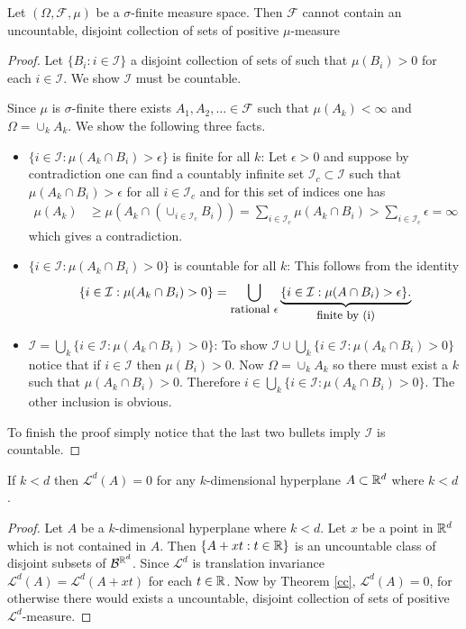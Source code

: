 \begin{theorem}
\label{cc}
Let $(\Omega, \mathcal F,\mu)$ be a $\sigma$-finite measure space. Then $\mathcal F$ cannot contain an uncountable, disjoint collection of sets of positive $\mu$-measure
\end{theorem}
\begin{proof}
Let $\{B_i: i\in \mathcal I\}$ a disjoint collection of sets of such that $\mu(B_i)>0$ for each $i\in\mathcal I$.
We show $\mathcal I$ must be countable.


Since $\mu$ is $\sigma$-finite there exists $A_1,A_2,\ldots \in\mathcal F$ such that $\mu(A_k)<\infty$ and $\Omega = \cup_k A_k$.  We show the following three facts.
\begin{itemize}
\item $\{ i\in \mathcal I: \mu(A_k\cap B_i)>\epsilon\}$ is finite for all $k$:
Let $\epsilon>0$ and suppose by contradiction one can find a countably infinite set  $\mathcal I_c\subset \mathcal I$ such that $\mu(A_k\cap B_i)>\epsilon $ for all $i\in \mathcal I_c$ and for this set of indices one has
\begin{align*}
\mu(A_k)&\geq \mu(A_k\cap (\cup_{i\in\mathcal I_c}B_i ))= \sum_{i\in\mathcal I_c}\mu(A_k\cap B_i) > \sum_{i\in\mathcal I_c}\epsilon =\infty
\end{align*}
which gives a contradiction.
\item $\{ i\in \mathcal I: \mu(A_k\cap B_i)>0\}$ is countable for all $k$:
This follows from the  identity
\[\{ i\in \mathcal I: \mu(A_k\cap B_i)>0\}=\bigcup_\text{\small rational
$\epsilon$} \underbrace{\{ i\in \mathcal I: \mu(A\cap B_i)>\epsilon\}.} _\text{\small finite by (i)}   \]
\item $\mathcal I = \bigcup_k \{ i\in \mathcal I: \mu(A_k\cap B_i)>0\}$:
 To show $\mathcal I \cup \bigcup_k \{ i\in \mathcal I: \mu(A_k\cap B_i)>0\}$ notice that  if $i\in\mathcal I$ then $\mu(B_i)>0$. Now  $\Omega =\cup_k A_k$ so there must exist a $k$ such that $\mu(A_k\cap B_i)>0$.  Therefore $i\in  \bigcup_k \{ i\in \mathcal I: \mu(A_k\cap B_i)>0\}$. The other inclusion is obvious.
\end{itemize}

 To finish the proof simply notice that the last two bullets imply $\mathcal I$ is countable.
\end{proof}


\begin{corollary}If $k<d$ then
$\mathcal L^d(A)=0$ for any $k$-dimensional hyperplane $A\subset \Bbb R^d$ where $k<d$.
\end{corollary}
\begin{proof}
Let $A$ be a $k$-dimensional hyperplane where $k<d$. Let $x$ be a point in $\Bbb R^d$ which is not  contained in $A$.
Then $\{A+xt: t\in\Bbb R\}$ is an uncountable class of disjoint subsets of $\mathcal B^{\Bbb R^d}$. Since $\mathcal L^d$ is translation invariance $\mathcal L^d(A) = \mathcal L^d(A+xt)$ for each $t\in\Bbb R$. Now by Theorem \ref{cc}, $\mathcal L^d(A)=0$, for otherwise there would exists a uncountable, disjoint collection of sets of positive $\mathcal L^d$-measure.
\end{proof}





